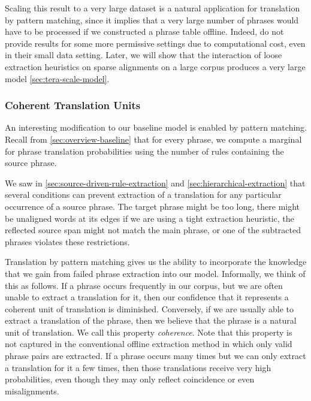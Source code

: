 Scaling this result to a very large dataset 
is a natural application for translation
by pattern matching, since it implies that a very large
number of phrases would have to be processed if we constructed
a phrase table offline.  Indeed, \citet{Ayan:2006:acl-coling}
do not provide results for some more permissive settings due
to computational cost, even in their small data setting.  
Later, we will show that the interaction of loose extraction
heuristics on sparse alignments on a large corpus produces
a very large model \textsection\ref{sec:tera-scale-model}.

\subsubsection{Coherent Translation Units}
\label{sec:coherence}

An interesting modification to our
baseline model is enabled by pattern matching. 
Recall from \textsection\ref{sec:overview-baseline}
that for every phrase, we compute a marginal for 
phrase translation probabilities using the number of
rules containing the source phrase.

We saw in \textsection\ref{sec:source-driven-rule-extraction}
and \textsection\ref{sec:hierarchical-extraction} that
several conditions can prevent extraction of a translation
for any particular occurrence of a source phrase.
The target phrase
might be too long, there might be unaligned words
at its edges if we are using a tight extraction heuristic,
the reflected source span might not match the main
phrase, or one of the subtracted phrases violates
these restrictions.

Translation by pattern matching gives us the ability
to incorporate the knowledge that we gain from
failed phrase extraction into our model.
Informally, we think of this as follows.  If a
phrase occurs frequently in our corpus, but we are
often unable to extract a translation for it,
then our confidence that it represents a 
coherent unit of translation is diminished.  Conversely,
if we are usually able to extract a translation of the phrase, then
we believe that the phrase is a natural unit of translation.
We call this property {\em coherence}.  Note that this
property is not captured in the conventional offline
extraction method in which only valid phrase 
pairs are extracted.  If a phrase occurs many times but
we can only extract a translation for it a few 
times, then those translations receive very high probabilities,
even though they may only reflect coincidence or even 
misalignments.

